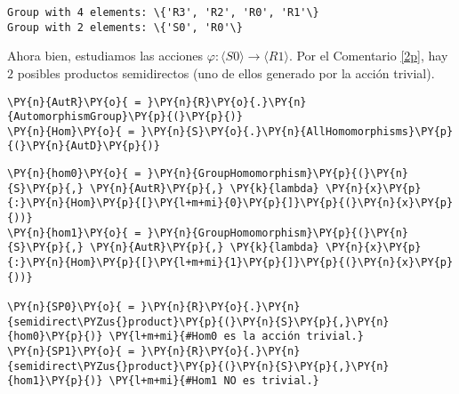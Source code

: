 \begin{enumerate}
            \begin{tcolorbox}[breakable, size=fbox, boxrule=.5pt, pad at break*=1mm, opacityfill=0]
    \begin{Verbatim}[commandchars=\\\{\}]
Group with 4 elements: \{'R3', 'R2', 'R0', 'R1'\}
Group with 2 elements: \{'S0', 'R0'\}
    \end{Verbatim}
    \end{tcolorbox}
    

Ahora bien, estudiamos las acciones $\varphi \colon \langle S0 \rangle \to \langle R1 \rangle$. Por el Comentario \ref{2p}, hay $2$ posibles productos semidirectos (uno de ellos  generado por la acción trivial). 





    \begin{tcolorbox}[breakable, size=fbox, boxrule=1pt, pad at break*=1mm,colback=cellbackground, colframe=cellborder]
\begin{Verbatim}[commandchars=\\\{\}]
\PY{n}{AutR}\PY{o}{ = }\PY{n}{R}\PY{o}{.}\PY{n}{AutomorphismGroup}\PY{p}{(}\PY{p}{)}
\PY{n}{Hom}\PY{o}{ = }\PY{n}{S}\PY{o}{.}\PY{n}{AllHomomorphisms}\PY{p}{(}\PY{n}{AutD}\PY{p}{)}
\end{Verbatim}
\end{tcolorbox}



    \begin{tcolorbox}[breakable, size=fbox, boxrule=1pt, pad at break*=1mm,colback=cellbackground, colframe=cellborder]
\begin{Verbatim}[commandchars=\\\{\}]
\PY{n}{hom0}\PY{o}{ = }\PY{n}{GroupHomomorphism}\PY{p}{(}\PY{n}{S}\PY{p}{,} \PY{n}{AutR}\PY{p}{,} \PY{k}{lambda} \PY{n}{x}\PY{p}{:}\PY{n}{Hom}\PY{p}{[}\PY{l+m+mi}{0}\PY{p}{]}\PY{p}{(}\PY{n}{x}\PY{p}{))}
\PY{n}{hom1}\PY{o}{ = }\PY{n}{GroupHomomorphism}\PY{p}{(}\PY{n}{S}\PY{p}{,} \PY{n}{AutR}\PY{p}{,} \PY{k}{lambda} \PY{n}{x}\PY{p}{:}\PY{n}{Hom}\PY{p}{[}\PY{l+m+mi}{1}\PY{p}{]}\PY{p}{(}\PY{n}{x}\PY{p}{))}

\PY{n}{SP0}\PY{o}{ = }\PY{n}{R}\PY{o}{.}\PY{n}{semidirect\PYZus{}product}\PY{p}{(}\PY{n}{S}\PY{p}{,}\PY{n}{hom0}\PY{p}{)} \PY{l+m+mi}{#Hom0 es la acción trivial.}
\PY{n}{SP1}\PY{o}{ = }\PY{n}{R}\PY{o}{.}\PY{n}{semidirect\PYZus{}product}\PY{p}{(}\PY{n}{S}\PY{p}{,}\PY{n}{hom1}\PY{p}{)} \PY{l+m+mi}{#Hom1 NO es trivial.}
\end{Verbatim}
\end{tcolorbox}



\end{enumerate}

